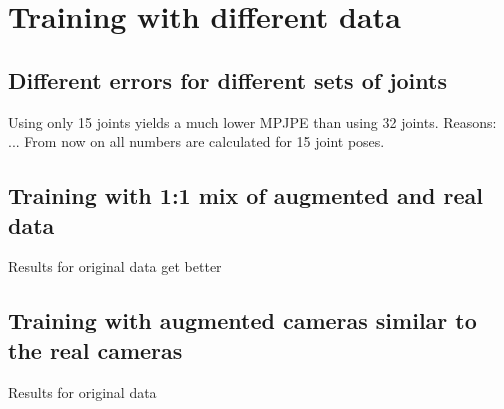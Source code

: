\section{Training with different data}

\subsection{Different errors for different sets of joints}
Using only 15 joints yields a much lower MPJPE than using 32 joints. Reasons: ...	
From now on all numbers are calculated for 15 joint poses.

\subsection{Training with 1:1 mix of augmented and real data}
Results for original data get better



\subsection{Training with augmented cameras similar to the real cameras}
Results for original data